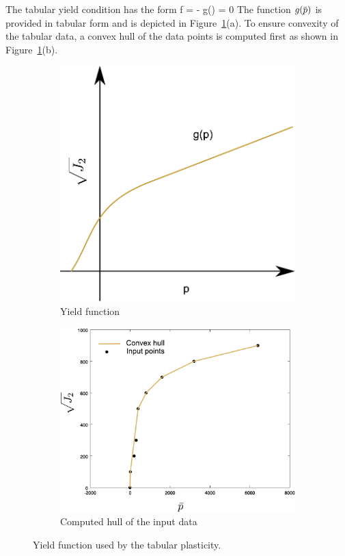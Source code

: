 The tabular yield condition has the form
\Beq
  f =  - g(\pbar) = 0
\Eeq
The function $g(\pbar)$ is provided in tabular form and is depicted in 
Figure~\ref{fig:tabular_yield_function}(a). 
To ensure convexity of the tabular data, a convex hull of the data points is computed
first as shown in Figure~\ref{fig:tabular_yield_function}(b).
\begin{figure}[htbp!]
  \begin{subfigure}[t]{0.5\textwidth}
    \centering
    \includegraphics[width=\textwidth]{Figs/tabular/TabularYieldFn.pdf}
    \caption{Yield function}
  \end{subfigure}
  \begin{subfigure}[t]{0.5\textwidth}
    \centering
    \includegraphics[width=\textwidth]{Figs/tabular/tabular_yield_hull.pdf}
    \caption{Computed hull of the input data}
  \end{subfigure}
  \caption{Yield function used by the tabular plasticity.}
  \label{fig:tabular_yield_function}
\end{figure}

